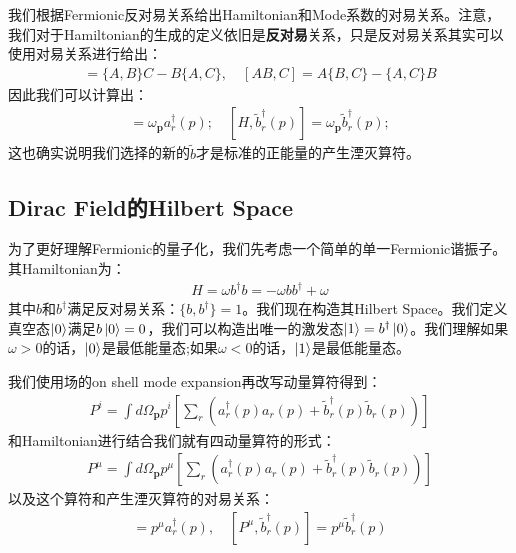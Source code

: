 \bigskip
{}

我们根据Fermionic反对易关系给出Hamiltonian和Mode系数的对易关系。注意，我们对于Hamiltonian的生成的定义依旧是\textbf{反对易}关系，只是反对易关系其实可以使用对易关系进行给出：
\begin{align}
  [A,BC]=\{A,B\}C - B\{A,C\}, \quad [AB,C]=A\{B,C\} - \{A,C\}B
\end{align}
因此我们可以计算出：
\begin{align}
  [H,a_r^\dagger(p)]=\omega_\mathbf{p}a_r^\dagger(p);\quad
  [H,\tilde{b}_r^\dagger(p)]=\omega_\mathbf{p}\tilde{b}_r^\dagger(p);
\end{align}
这也确实说明我们选择的新的$ \tilde{b} $才是标准的正能量的产生湮灭算符。

\subsection{Dirac Field的Hilbert Space}


为了更好理解Fermionic的量子化，我们先考虑一个简单的单一Fermionic谐振子。其Hamiltonian为：
\begin{align}
  H=\omega b^\dagger b = -\omega bb^\dagger + \omega
\end{align}
其中$ b $和$ b^\dagger $满足反对易关系：$ \{b,b^\dagger\}=1 $。我们现在构造其Hilbert
Space。我们定义真空态$ \ket{0} $满足$ b\ket{0} = 0 $，我们可以构造出唯一的激发态$ \ket{1} =
b^\dagger\ket{0} $。我们理解如果$ \omega >0 $的话，$ \ket{0} $是最低能量态;如果$ \omega
<0 $的话，$ \ket{1} $是最低能量态。


我们使用场的on shell mode expansion再改写动量算符得到：
\begin{align}
  P^i =  \int
  d\Omega_{\mathbf{p}}p^i\left[\sum_{r}\left(a_{r}^{\dagger}(p)a_{r}(p)+\tilde{b}_{r}^{\dagger}(p)\tilde{b}_{r}(p)\right)\right]
\end{align}
和Hamiltonian进行结合我们就有四动量算符的形式：
\begin{align}
  P^\mu =  \int
  d\Omega_{\mathbf{p}}p^\mu\left[\sum_{r}\left(a_{r}^{\dagger}(p)a_{r}(p)+\tilde{b}_{r}^{\dagger}(p)\tilde{b}_{r}(p)\right)\right]
\end{align}
以及这个算符和产生湮灭算符的对易关系：
\begin{align}
  [P^\mu,a_r^\dagger(p)]=p^\mu a_r^\dagger(p),\quad
  [P^\mu,\tilde{b}_r^\dagger(p)]=p^\mu \tilde{b}_r^\dagger(p)
\end{align}

